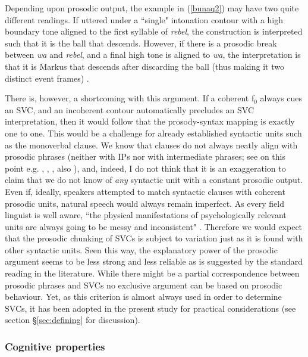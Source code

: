 Depending upon prosodic output, the example in (\ref{bunaq2}) may have two quite different readings. If uttered under a ``single" intonation contour with a high boundary tone aligned to the first syllable of \textit{rebel}, the construction is interpreted such that it is the ball that descends. However, if there is a prosodic break between \textit{wa} and \textit{rebel}, and a final high tone is aligned to \textit{wa}, the interpretation is that it is Markus that descends after discarding the ball (thus making it two distinct event frames) \citep[442]{schapper2009bunaq}.

There is, however, a shortcoming with this argument. If a coherent f$_0$ always cues an SVC, and an incoherent contour automatically precludes an SVC interpretation, then it would follow that the prosody-syntax mapping is exactly one to one. This would be a challenge for already established syntactic units such as the monoverbal clause. We know that clauses do not always neatly align with prosodic phrases (neither with \textsc{IP}s nor with intermediate phrases; see on this point e.g. \citealt{chafe1994discourse}, \citealt{himmelmann2006challenges}, \citealt{ladd2008intonational}, also \citealt{engelhardt2010}), and, indeed, I do not think that it is an exaggeration to claim that we do not know of \emph{any} syntactic unit with a constant prosodic output. Even if, ideally, speakers attempted to match syntactic clauses with coherent prosodic units, natural speech would always remain imperfect. As every field linguist is well aware, ``the physical manifestations of psychologically relevant units are always going to be messy and inconsistent" \citep[58]{chafe1994discourse}. Therefore we would expect that the prosodic chunking of SVCs is subject to variation just as it is found with other syntactic units. Seen this way, the explanatory power of the prosodic argument seems to be less strong and less reliable as is suggested by the standard reading in the literature. While there might be a partial correspondence between prosodic phrases and SVCs no exclusive argument can be based on prosodic behaviour. Yet, as this criterion is almost always used in order to determine SVCs, it has been adopted in the present study for practical considerations (see section §\ref{sec:defining} for discussion).

\subsubsection{Cognitive properties} \label{sec:cognitive}

